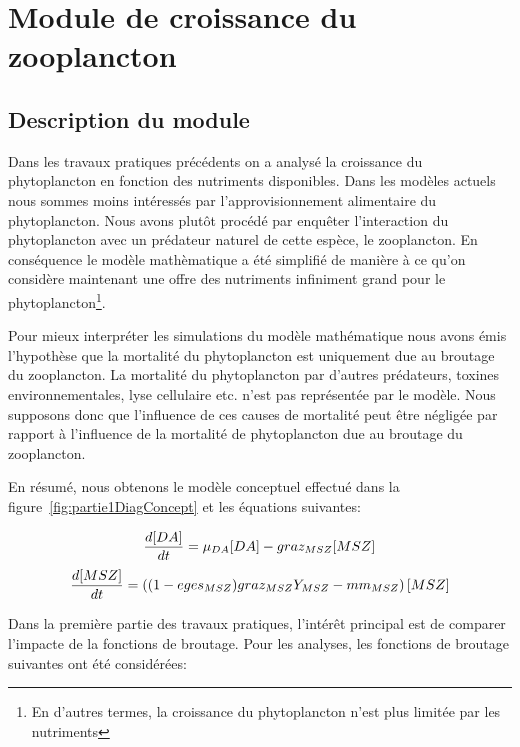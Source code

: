 \section{Module de croissance du zooplancton}

\subsection{Description du module}
\par{
Dans les travaux pratiques précédents on a analysé la croissance du phytoplancton en fonction des
nutriments disponibles. Dans les modèles actuels nous sommes moins intéressés par l'approvisionnement
alimentaire du phytoplancton. Nous avons plutôt procédé par enquêter l'interaction du phytoplancton avec
un prédateur naturel de cette espèce, le zooplancton. En conséquence le modèle mathèmatique a été simplifié
de manière à ce qu'on considère maintenant une offre des nutriments infiniment grand pour le
phytoplancton\footnote{En d'autres termes, la croissance du phytoplancton n'est plus limitée par les
nutriments}.
\par{
Pour mieux interpréter les simulations du modèle mathématique nous avons émis l'hypothèse que la mortalité
du phytoplancton est uniquement due au broutage du zooplancton. La mortalité du phytoplancton par d'autres
prédateurs, toxines environnementales, lyse cellulaire etc. n'est pas représentée par le modèle.
Nous supposons donc que l'influence de ces causes de mortalité peut être négligée par rapport à l'influence
de la mortalité de phytoplancton due au broutage du zooplancton.
}
\par{
En résumé, nous obtenons le modèle conceptuel effectué dans la figure~\ref{fig:partie1DiagConcept}
et les équations suivantes:
}

\begin{equation}
  {{d[DA]}\over{dt}} =
  \mu_{DA} [DA] - graz_{MSZ} [MSZ]
  \label{eq:partie1DiffEq1}
\end{equation}
\begin{equation}
  {{d[MSZ]}\over{dt}} =
  \left (
    (1- eges_{MSZ}) graz_{MSZ} Y_{MSZ} - mm_{MSZ}
  \right ) [MSZ]
  \label{eq:partie1DiffEq2}
\end{equation}

\par{
Dans la première partie des travaux pratiques, l'intérêt principal est de comparer l'impacte de la
fonctions de broutage. Pour les analyses, les fonctions de broutage suivantes ont été considérées:
}

}
